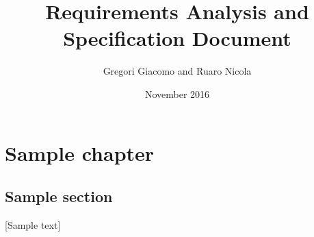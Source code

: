 \documentclass[openright, draft]{report}
\begin{document}
	\title{Requirements Analysis and Specification Document}
    \author{Gregori Giacomo and Ruaro Nicola}
    \date{November 2016}
    
    \maketitle
    
	\chapter{Sample chapter}
    	\section{Sample section}
			[Sample text]
\end{document}
